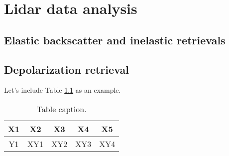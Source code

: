 \chapter{Lidar data analysis}
\label{sect:devs02_chapter2}

\section{Elastic backscatter and inelastic retrievals}
\label{sect::devs02_chapter2_elastic}

\section{Depolarization retrieval}
\label{sect::devs02_chapter2_inelastic}


Let's include Table \ref{tab::table01} as an example.

\begin{table}[h]     
	\caption{Table caption.}
	\label{tab::table01}
	\footnotesize
	\begin{center}
		\begin{tabular}{ccccc}
			\toprule
			X1 & X2 & X3 & X4 & X5\\
			\midrule
            Y1 & XY1 & XY2 & XY3 & XY4\\
			\bottomrule
		\end{tabular}
	\end{center}
\end{table}
